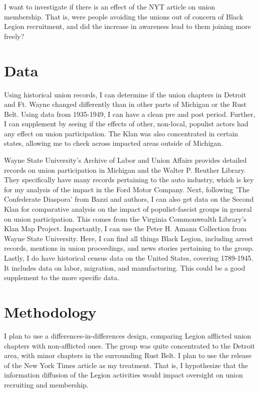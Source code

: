 \documentclass[11pt]{article}
\theoremstyle{definition}
\theoremstyle{remark}
\begin{document}
I want to investigate if there is an effect of the NYT article on union membership. That is, were people avoiding the unions out of concern of Black Legion recruitment, and did the increase in awareness lead to them joining more freely?

\section{Data}

Using historical union records, I can determine if the union chapters in Detroit and Ft. Wayne changed differently than in other parts of Michigan or the Rust Belt. Using data from 1935-1949, I can have a clean pre and post period. Further, I can supplement by seeing if the effects of other, non-local, populist actors had any effect on union participation. The Klan was also concentrated in certain states, allowing me to check across impacted areas outside of Michigan.

Wayne State University's Archive of Labor and Union Affairs provides detailed records on union participation in Michigan and the Walter P. Reuther Library. They specifically have many records pertaining to the auto industry, which is key for my analysis of the impact in the Ford Motor Company. Next, following 'The Confederate Diaspora' from Bazzi and authors, I can also get data on the Second Klan for comparative analysis on the impact of populist-fascist groups in general on union participation. This comes from the Virginia Commonwealth Library's Klan Map Project. Importantly, I can use the Peter H. Amann Collection from Wayne State University. Here, I can find all things Black Legion, including arrest records, mentions in union proceedings, and news stories pertaining to the group. Lastly, I do have historical census data on the United States, covering 1789-1945. It includes data on labor, migration, and manufacturing. This could be a good supplement to the more specific data.

\section{Methodology}

I plan to use a differences-in-differences design, comparing Legion afflicted union chapters with non-afflicted ones. The group was quite concentrated to the Detroit area, with minor chapters in the surrounding Rust Belt. I plan to use the release of the New York Times article as my treatment. That is, I hypothesize that the information diffusion of the Legion activities would impact oversight on union recruiting and membership. 
\end{document}
